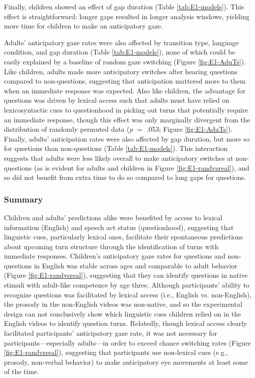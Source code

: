 \documentclass[authoryear, 12pt]{elsarticle}
\begin{document}
Finally, children showed an effect of gap duration (Table \ref{tab:E1-models}). This effect is straightforward: longer gaps resulted in longer analysis windows, yielding more time for children to make an anticipatory gaze.

Adults' anticipatory gaze rates were also affected by transition type, language condition, and gap duration (Table \ref{tab:E1-models}), none of which could be easily explained by a baseline of random gaze switching (Figure \ref{fig:E1-AduTs}). Like children, adults made more anticipatory switches after hearing questions compared to non-questions, suggesting that anticipation mattered more to them when an immediate response was expected. Also like children, the advantage for questions was driven by lexical access such that adults must have relied on lexicosyntactic cues to questionhood in picking out turns that potentially require an immediate response, though this effect was only marginally divergent from the distribution of randomly permuted data (\textit{p} $=$ .053; Figure \ref{fig:E1-AduTs}). Finally, adults' anticipation rates were also affected by gap duration, but more so for questions than non-questions (Table \ref{tab:E1-models}). This interaction suggests that adults were less likely overall to make anticipatory switches at non-questions (as is evident for adults and children in Figure \ref{fig:E1-randvsreal}), and so did not benefit from extra time to do so compared to long gaps for questions.

\subsubsection{Summary}
\label{sec:summary1}

Children and adults' predictions alike were benefited by access to lexical information (English) and speech act status (questionhood), suggesting that linguistic cues, particularly lexical ones, facilitate their spontaneous predictions about upcoming turn structure through the identification of turns with immediate responses. Children's anticipatory gaze rates for questions and non-questions in English was stable across ages and comparable to adult behavior (Figure \ref{fig:E1-randvsreal}), suggesting that they can identify questions in native stimuli with adult-like competence by age three. Although participants' ability to recognize questions was facilitated by lexical access (i.e., English vs. non-English), the prosody in the non-English videos was non-native, and so the experimental design can not conclusively show which linguistic cues children relied on in the English videos to identify question turns. Relatedly, though lexical access clearly facilitated participants' anticipatory gaze rate, it was not necessary for participants---especially adults---in order to exceed chance switching rates (Figure \ref{fig:E1-randvsreal}), suggesting that participants use non-lexical cues (e.g., prosody, non-verbal behavior) to make anticipatory eye movements at least some of the time.
\end{document}
